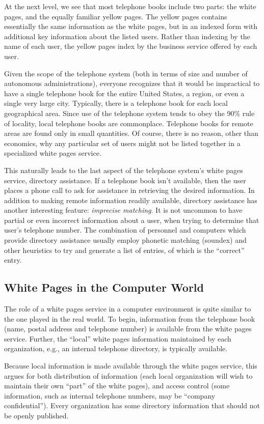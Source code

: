 At the next level,
we see that most telephone books include two parts:
the white pages,
and the equally familiar yellow pages.
The yellow pages contains essentially the same information as the white pages,
but in an indexed form with additional key information about the listed users.
Rather than indexing by the name of each user,
the yellow pages index by the business service offered by each user.

Given the scope of the telephone system
(both in terms of size and number of autonomous administrations),
everyone recognizes that it would be impractical to have a single telephone
book for the entire United States, a region, or even a single very large city.
Typically,
there is a telephone book for each local geographical area.
Since use of the telephone system tends to obey the 90\% rule of locality,
local telephone books are commonplace.
Telephone books for remote areas are found only in small quantities.
Of course,
there is no reason,
other than economics,
why any particular set of users might not be listed together in a specialized
white pages service.

This naturally leads to the last aspect of the telephone system's white pages
service, directory assistance.
If a telephone book isn't available,
then the user places a phone call to ask for assistance in retrieving the
desired information.
In addition to making remote information readily available,
directory assistance has another interesting feature:
{\em imprecise matching}.
It is not uncommon to have partial or even incorrect information about a user,
when trying to determine that user's telephone number.
The combination of personnel and computers which provide directory assistance
usually employ phonetic matching (soundex) and other heuristics to try and
generate a list of entries, of which is the ``correct'' entry.

\subsection	{White Pages in the Computer World}
The role of a white pages service in a computer environment is quite similar
to the one played in the real world.
To begin,
information from the telephone book
(name, postal address and telephone number)
is available from the white pages service.
Further,
the ``local'' white pages information maintained by each organization,
e.g., an internal telephone directory,
is typically available.

Because local information is made available through the white pages service,
this argues for both distribution of information
(each local organization will wish to maintain their own ``part'' of the
white pages),
and access control
(some information, such as internal telephone numbers,
may be ``company confidential'').  Every organization has some directory
information that should not be openly published.

